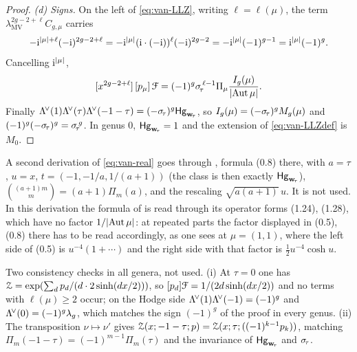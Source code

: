 \begin{proof}
\emph{(d) Signs.} On the left of \eqref{eq:van-LLZ}, writing $\ell=\ell(\mu)$, the term $\lambda_{\mathrm{MV}}^{2g-2+\ell}C_{g,\mu}$ carries
\[
-\mathrm{i}^{\lvert\mu\rvert+\ell}(-\mathrm{i})^{2g-2+\ell}=-\mathrm{i}^{\lvert\mu\rvert}(\mathrm{i}\cdot(-\mathrm{i}))^{\ell}(-\mathrm{i})^{2g-2}=-\mathrm{i}^{\lvert\mu\rvert}(-1)^{g-1}=\mathrm{i}^{\lvert\mu\rvert}(-1)^g.
\]
Cancelling $\mathrm{i}^{\lvert\mu\rvert}$,
\[
[x^{2g-2+\ell}]\,[p_\mu]\,\mathcal{F}=(-1)^g\sigma_{\!\tau}^{\,\ell-1}\Pi_\mu\frac{I_g(\mu)}{\lvert\operatorname{Aut}\mu\rvert}.
\]
Finally $\Lambda^{\!\vee}(1)\Lambda^{\!\vee}(\tau)\Lambda^{\!\vee}(-1-\tau)=(-\sigma_{\!\tau})^g\mathsf{Hg}_{\mathbf{w}_{\!\tau}}$, so $I_g(\mu)=(-\sigma_{\!\tau})^gM_g(\mu)$ and $(-1)^g(-\sigma_{\!\tau})^g=\sigma_{\!\tau}^{\,g}$. In genus $0$, $\mathsf{Hg}_{\mathbf{w}_{\!\tau}}=1$ and the extension of \eqref{eq:van-LLZdef} is $M_0$.
\end{proof}

\begin{rmk}
A second derivation of \eqref{eq:van-real} goes through \cite[Theorem~1]{OP04}, formula (0.8) there, with $a=\tau$, $u=x$, $t=(-1,-1/a,1/(a+1))$ (the class is then exactly $\mathsf{Hg}_{\mathbf{w}_{\!\tau}}$), $\binom{(a+1)m}{m}=(a+1)\Pi_m(a)$, and the rescaling $\sqrt{a(a+1)}\,u$. It is not used. In this derivation the formula of \cite{OP04} is read through its operator forms (1.24), (1.28), which have no factor $1/\lvert\operatorname{Aut}\mu\rvert$: at repeated parts the factor displayed in (0.5), (0.8) there has to be read accordingly, as one sees at $\mu=(1,1)$, where the left side of (0.5) is $u^{-4}(1+\cdots)$ and the right side with that factor is $\tfrac12u^{-4}\cosh u$.
\end{rmk}

\begin{rmk}
Two consistency checks in all genera, not used. (i) At $\tau=0$ one has $\mathcal{Z}=\exp(\sum_dp_d/(d\cdot 2\sinh(dx/2)))$, so $[p_d]\mathcal{F}=1/(2d\sinh(dx/2))$ and no terms with $\ell(\mu)\geq 2$ occur; on the Hodge side $\Lambda^{\!\vee}(1)\Lambda^{\!\vee}(-1)=(-1)^g$ and $\Lambda^{\!\vee}(0)=(-1)^g\lambda_g$, which matches the sign $(-1)^g$ of the proof in every genus. (ii) The transposition $\nu\mapsto\nu'$ gives $\mathcal{Z}(x;-1-\tau;p)=\mathcal{Z}(x;\tau;((-1)^{k-1}p_k))$, matching $\Pi_m(-1-\tau)=(-1)^{m-1}\Pi_m(\tau)$ and the invariance of $\mathsf{Hg}_{\mathbf{w}_{\!\tau}}$ and $\sigma_{\!\tau}$.
\end{rmk}

